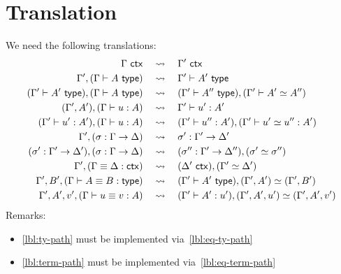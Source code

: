 
\section{Translation}
\label{sec:translation}

We need the following translations:
%
\begin{align}
  \Gamma\ \mathsf{ctx}
  &\quad\leadsto\quad
  \Gamma'\ \mathsf{ctx}
  \\
  \Gamma', (\Gamma \vdash A \ \mathsf{type}) 
  &\quad\leadsto\quad
  \Gamma' \vdash A' \ \mathsf{type}
  \\
  \label{lbl:ty-path}
  (\Gamma' \vdash A' \ \mathsf{type}), (\Gamma \vdash A \ \mathsf{type})
  &\quad\leadsto\quad
  (\Gamma' \vdash A'' \ \mathsf{type}), (\Gamma' \vdash A' \simeq A'')
  \\
  (\Gamma', A'), (\Gamma \vdash u : A)
  &\quad\leadsto\quad
  \Gamma' \vdash u' : A'
  \\
  \label{lbl:term-path}
  (\Gamma' \vdash u' : A'), (\Gamma \vdash u : A)
  &\quad\leadsto\quad
  (\Gamma' \vdash u'' : A'), (\Gamma' \vdash u' \simeq u'' : A')
  \\
  \Gamma', (\sigma : \Gamma \to \Delta)
  &\quad\leadsto\quad
  \sigma' : \Gamma' \to \Delta'
  \\
  (\sigma' : \Gamma' \to \Delta'), (\sigma : \Gamma \to \Delta)
  &\quad\leadsto\quad
  (\sigma'' : \Gamma' \to \Delta''), (\sigma' \simeq \sigma'')
  \\
  \Gamma', (\Gamma \equiv \Delta : \mathsf{ctx})
  &\quad\leadsto\quad
  (\Delta'\ \mathsf{ctx}), (\Gamma' \simeq \Delta')
  \\
  \label{lbl:eq-ty-path}
  \Gamma', B', (\Gamma \vdash A \equiv B : \mathsf{type})
  &\quad\leadsto\quad
  (\Gamma' \vdash A' \ \mathsf{type}), (\Gamma',A') \simeq (\Gamma',B')
  \\
  \label{lbl:eq-term-path}
  \Gamma', A', v', (\Gamma \vdash u \equiv v : A)
  &\quad\leadsto\quad
  (\Gamma' \vdash A' : u'), (\Gamma',A',u') \simeq (\Gamma',A',v')
\end{align}
%
Remarks:
%
\begin{itemize}
\item \eqref{lbl:ty-path} must be implemented via~\eqref{lbl:eq-ty-path}
\item \eqref{lbl:term-path} must be implemented via~\eqref{lbl:eq-term-path}
\end{itemize}





